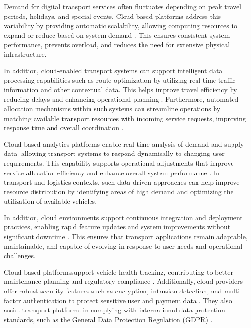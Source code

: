 Demand for digital transport services often fluctuates depending on peak travel
periods, holidays, and special events. Cloud-based platforms address this
variability by providing automatic scalability, allowing computing resources to
expand or reduce based on system demand
\cite{Lucidchart_ReliabilityAvailability} \cite{Appicial_TaxiZambia_2024}. This
ensures consistent system performance, prevents overload, and reduces the need
for extensive physical infrastructure.


In addition, cloud-enabled transport systems can support intelligent data
processing capabilities such as route optimization by utilizing real-time
traffic information and other contextual data. This helps improve travel
efficiency by reducing delays and enhancing operational planning
\cite{Cloudester_AIRouteOptimization}. Furthermore, automated allocation
mechanisms within such systems can streamline operations by matching available
transport resources with incoming service requests, improving response time and
overall coordination \cite{Ridewyze_AutomatedScheduling}.


Cloud-based analytics platforms enable real-time analysis of demand and supply
data, allowing transport systems to respond dynamically to changing user
requirements. This capability supports operational adjustments that improve
service allocation efficiency and enhance overall system performance
\cite{Waehner_DynamicPricing_Kafka}. In transport and logistics contexts, such
data-driven approaches can help improve resource distribution by identifying
areas of high demand and optimizing the utilization of available vehicles.


In addition, cloud environments support continuous integration and deployment
practices, enabling rapid feature updates and system improvements without
significant downtime \cite{Cloudfresh_CICD_DevOps}. This ensures that transport
applications remain adaptable, maintainable, and capable of evolving in response
to user needs and operational challenges.


Cloud-based platformssupport vehicle health tracking, contributing to better
maintenance planning and regulatory compliance
\cite{Moiboo_VehicleDiagnostics_USA}. Additionally, cloud providers offer robust
security features such as encryption, intrusion detection, and multi-factor
authentication to protect sensitive user and payment data \cite{Amola}. They
also assist transport platforms in complying with international data protection
standards, such as the General Data Protection Regulation (GDPR)
\cite{GoogleCloudGDPR2025}.


